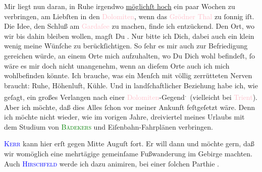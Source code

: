 \pstart
           Mir liegt nun daran, in Ruhe irgendwo \uline{möglichſt hoch}
               ein paar Wochen zu verbringen, am Liebſten in den \textcolor{pink}{Dolomiten}{}\ledrightnote{\textcolor{pink}{Dolomiten}}, wenn das \textcolor{pink}{Grödner Thal}{}\ledrightnote{\textcolor{pink}{Val Gardena}} zu
               ſonnig iſt. Die Idee, den Schluß am \textcolor{pink}{Gardaſee}{}\ledrightnote{\textcolor{pink}{Lago di Garda}} zu
               machen, finde ich entzückend. Den Ort, wo wir bis dahin bleiben wollen, magſt Du
                  \label{K_L03073-2v}\label{K_L03073-2h}. Nur bitte ich Dich, dabei auch ein klein wenig meine Wünſche zu
               berückſichtigen. So ſehr {\pb}es mir auch
               zur Befriedigung gereichen würde, an einem Orte mich aufzuhalten, wo Du Dich wohl
               befindeſt, ſo wäre es mir doch nicht \strikeout{\textcolor{gray}{×}} unangenehm, wenn an dieſem Orte auch ich mich wohlbefinden könnte. Ich
               brauche, was ein Menſch mit völlig zerrütteten Nerven braucht: Ruhe, Höhenluft,
               Kühle. Und in landſchaftlicher Beziehung habe ich, wie geſagt, ein großes  Verlangen nach einer \textcolor{pink}{Dolomiten}{}\ledrightnote{\textcolor{pink}{Dolomiten}}-Gegend\substVorne{}\textsuperscript{.}\substDazwischen{} (\substHinten{}vielleicht bei \textcolor{pink}{Trient}{}\ledrightnote{\textcolor{pink}{Trient}}). Aber ich möchte,
               daß dies Alles ſchon vor meiner Ankunft {\pb}feſtgeſetzt wäre. Denn ich möchte nicht wieder, wie im vorigen Jahre, dreiviertel meines Urlaubs mit dem Studium von \textsc{\textcolor{green}{Bädekers}{}\ledrightnote{\textcolor{green}{Baedeker-Reiseführer}}} und Eiſenbahn-Fahrplänen verbringen.\pend
           
\pstart
           \textsc{\textcolor{blue}{Kerr}{}\ledrightnote{\textcolor{blue}{Alfred Kerr}}} kann hier erſt gegen Mitte Auguſt fort. Er will
               dann \label{K_L03073-3v}\label{K_L03073-3h} und möchte gern, daß
               wir womöglich eine mehrtägige gemeinſame Fußwanderung im Gebirge machten. Auch \textsc{\textcolor{blue}{Hirschfeld}{}\ledrightnote{\textcolor{blue}{Robert Hirschfeld}}}{ }{\pb}werde ich dazu animiren, bei einer
               ſolchen Parthie \label{K_L03073-5v}\label{K_L03073-5h}.\pend
           
